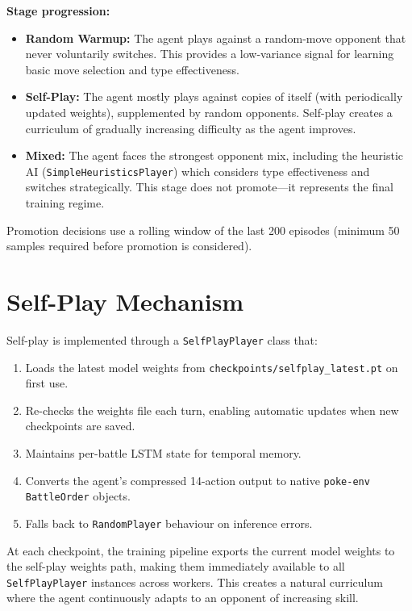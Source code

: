 \textbf{Stage progression:}
\begin{itemize}
  \item \textbf{Random Warmup:} The agent plays against a random-move opponent
        that never voluntarily switches.  This provides a low-variance signal
        for learning basic move selection and type effectiveness.
  \item \textbf{Self-Play:} The agent mostly plays against copies of itself
        (with periodically updated weights), supplemented by random opponents.
        Self-play creates a curriculum of gradually increasing difficulty as
        the agent improves.
  \item \textbf{Mixed:} The agent faces the strongest opponent mix, including
        the heuristic AI (\texttt{SimpleHeuristicsPlayer}) which considers type
        effectiveness and switches strategically.  This stage does not
        promote---it represents the final training regime.
\end{itemize}

Promotion decisions use a rolling window of the last 200 episodes (minimum 50
samples required before promotion is considered).

\section{Self-Play Mechanism}
\label{sec:self_play}

Self-play is implemented through a \texttt{SelfPlayPlayer} class that:

\begin{enumerate}
  \item Loads the latest model weights from
        \texttt{checkpoints/selfplay\_latest.pt} on first use.
  \item Re-checks the weights file each turn, enabling automatic updates
        when new checkpoints are saved.
  \item Maintains per-battle LSTM state for temporal memory.
  \item Converts the agent's compressed 14-action output to native
        \texttt{poke-env} \texttt{BattleOrder} objects.
  \item Falls back to \texttt{RandomPlayer} behaviour on inference errors.
\end{enumerate}

At each checkpoint, the training pipeline exports the current model weights to
the self-play weights path, making them immediately available to all
\texttt{SelfPlayPlayer} instances across workers.  This creates a natural
curriculum where the agent continuously adapts to an opponent of increasing
skill.

